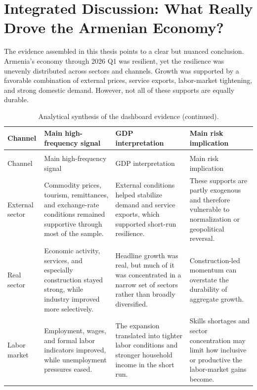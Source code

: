 \documentclass[12pt,a4paper]{report}
\begin{document}
\chapter{Integrated Discussion: What Really Drove the Armenian Economy?}
The evidence assembled in this thesis points to a clear but nuanced conclusion. Armenia's economy through 2026 Q1 was resilient, yet the resilience was unevenly distributed across sectors and channels. Growth was supported by a favorable combination of external prices, service exports, labor-market tightening, and strong domestic demand. However, not all of these supports are equally durable.

\begingroup
\footnotesize
\setlength{\tabcolsep}{4pt}
\begin{longtable}{@{}>{\raggedright\arraybackslash}p{2.35cm}>{\raggedright\arraybackslash}p{4.05cm}>{\raggedright\arraybackslash}p{4.05cm}>{\raggedright\arraybackslash}p{4.05cm}@{}}
    \caption{Analytical synthesis of the dashboard evidence.}
    \label{tab:dashboard_synthesis}\\
    \toprule
    Channel & Main high-frequency signal & GDP interpretation & Main risk implication \\
    \midrule
    \endfirsthead
    \caption[]{Analytical synthesis of the dashboard evidence (continued).}\\
    \toprule
    Channel & Main high-frequency signal & GDP interpretation & Main risk implication \\
    \midrule
    \endhead
    \bottomrule
    \endfoot
    External sector & Commodity prices, tourism, remittances, and exchange-rate conditions remained supportive through most of the sample. & External conditions helped stabilize demand and service exports, which supported short-run resilience. & These supports are partly exogenous and therefore vulnerable to normalization or geopolitical reversal. \\
    Real sector & Economic activity, services, and especially construction stayed strong, while industry improved more selectively. & Headline growth was real, but much of it was concentrated in a narrow set of sectors rather than broadly diversified. & Construction-led momentum can overstate the durability of aggregate growth. \\
    Labor market & Employment, wages, and formal labor indicators improved, while unemployment pressures eased. & The expansion translated into tighter labor conditions and stronger household income in the short run. & Skills shortages and sector concentration may limit how inclusive or productive the labor-market gains become. \\

\end{longtable}
\end{document}
